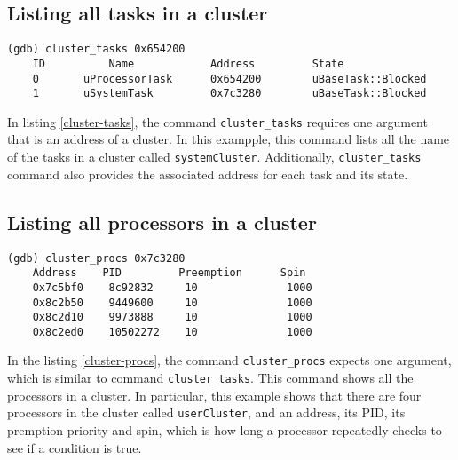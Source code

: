 \subsection{Listing all tasks in a cluster}
\begin{lstlisting}[caption={\text{cluster\_tasks} command}, label={cluster-tasks}]
(gdb) cluster_tasks 0x654200
    ID          Name            Address         State
    0       uProcessorTask      0x654200        uBaseTask::Blocked
    1       uSystemTask         0x7c3280        uBaseTask::Blocked
\end{lstlisting}
In listing \ref{cluster-tasks}, the command \verb|cluster_tasks| requires one
argument that is an address of a cluster. In this exampple, this command lists
all the name of the tasks in a cluster called \verb|systemCluster|.
Additionally, \verb|cluster_tasks| command also provides the associated address
for each task and its state.

\subsection{Listing all processors in a cluster}
\begin{lstlisting}[caption={\text{cluster\_procs} command}, label={cluster-procs}]
(gdb) cluster_procs 0x7c3280
    Address    PID         Preemption      Spin
    0x7c5bf0    8c92832     10              1000
    0x8c2b50    9449600     10              1000
    0x8c2d10    9973888     10              1000
    0x8c2ed0    10502272    10              1000
\end{lstlisting}
In the listing \ref{cluster-procs}, the command \verb|cluster_procs| expects one
argument, which is similar to command \verb|cluster_tasks|. This command shows
all the processors in a cluster. In particular, this example shows that there
are four processors in the cluster called \verb|userCluster|, and an address,
its PID, its premption priority and spin, which is how long a processor
repeatedly checks to see if a condition is true.

